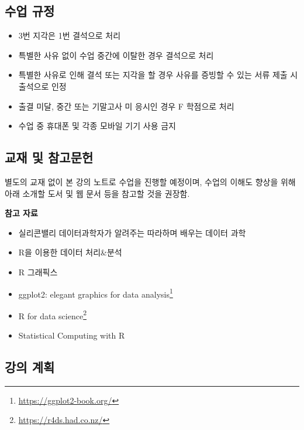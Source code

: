 \documentclass[
  11pt,
]{krantz}
\makeatletter
\providecommand{\tightlist}{%
  \setlength{\itemsep}{0pt}\setlength{\parskip}{0pt}}
\renewcommand{\href}[2]{#2\footnote{\url{#1}}}
\newenvironment{kframe}{%
\medskip{}
\setlength{\fboxsep}{.8em}
 \def\at@end@of@kframe{}%
 \ifinner\ifhmode%
  \def\at@end@of@kframe{\end{minipage}}%
  \begin{minipage}{\columnwidth}%
 \fi\fi%
 \def\FrameCommand##1{\hskip\@totalleftmargin \hskip-\fboxsep
 \colorbox{shadecolor}{##1}\hskip-\fboxsep
     \hskip-\linewidth \hskip-\@totalleftmargin \hskip\columnwidth}%
 \MakeFramed {\advance\hsize-\width
   \@totalleftmargin\z@ \linewidth\hsize
   \@setminipage}}%
 {\par\unskip\endMakeFramed%
 \at@end@of@kframe}
\renewenvironment{quote}{\begin{kframe}}{\end{kframe}}
\makeatother
\begin{document}
\hypertarget{policy-course}{%
\subsection*{수업 규정}\label{policy-course}}


\begin{quote}
\begin{itemize}
\tightlist
\item
  3번 지각은 1번 결석으로 처리
\item
  특별한 사유 없이 수업 중간에 이탈한 경우 결석으로 처리
\item
  특별한 사유로 인해 결석 또는 지각을 할 경우 사유를 증빙할 수 있는 서류 제출 시 출석으로 인정
\item
  출결 미달, 중간 또는 기말고사 미 응시인 경우 F 학점으로 처리
\item
  수업 중 휴대폰 및 각종 모바일 기기 사용 금지
\end{itemize}
\end{quote}

\hypertarget{material-course}{%
\subsection*{교재 및 참고문헌}\label{material-course}}


\begin{quote}
별도의 교재 없이 본 강의 노트로 수업을 진행할 예정이며, 수업의 이해도 향상을 위해 아래 소개할 도서 및 웹 문서 등을 참고할 것을 권장함.
\end{quote}

\textbf{참고 자료}

\begin{itemize}
\tightlist
\item
  실리콘밸리 데이터과학자가 알려주는 따라하며 배우는 데이터 과학 \citep{kwon-2017}
\item
  R을 이용한 데이터 처리\&분석 \citep{seo-2014}
\item
  R 그래픽스 \citep{ryu-2005}
\item
  \href{https://ggplot2-book.org/}{ggplot2: elegant graphics for data analysis} \citep{wickham-2016}
\item
  \href{https://r4ds.had.co.nz/}{R for data science} \citep{wickham-2016r}
\item
  Statistical Computing with R \citep{rizzo-2019}
\end{itemize}

\hypertarget{course-schedule}{%
\subsection*{강의 계획}\label{course-schedule}}
\end{document}
